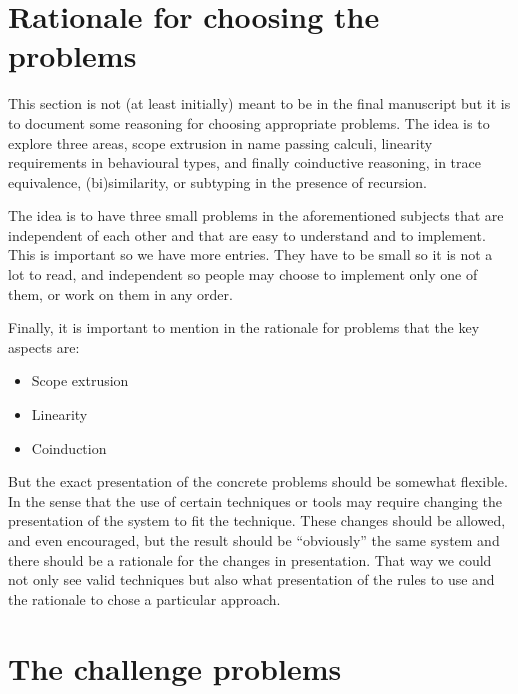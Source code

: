 \documentclass{article}
\begin{document}
\section{Rationale for choosing the problems}\label{sec:rationale}

This section is not (at least initially) meant to be in the final
manuscript but it is to document some reasoning for choosing
appropriate problems. The idea is to explore three areas, scope
extrusion in name passing calculi, linearity requirements in
behavioural types, and finally coinductive reasoning, in trace
equivalence, (bi)similarity, or subtyping in the presence of
recursion.

The idea is to have three small problems in the aforementioned
subjects that are independent of each other and that are easy to
understand and to implement. This is important so we have more
entries. They have to be small so it is not a lot to read, and
independent so people may choose to implement only one of them, or
work on them in any order.

Finally, it is important to mention in the rationale for problems that
the key aspects are:
\begin{itemize}
\item Scope extrusion
\item Linearity
\item Coinduction
\end{itemize}

But the exact presentation of the concrete problems should be somewhat
flexible. In the sense that the use of certain techniques or tools may
require changing the presentation of the system to fit the technique.
These changes should be allowed, and even encouraged, but the result
should be ``obviously'' the same system and there should be a
rationale for the changes in presentation. That way we could not only
see valid techniques but also what presentation of the rules to use
and the rationale to chose a particular approach.

\section{The challenge problems} \label{sec:problems}
\end{document}
